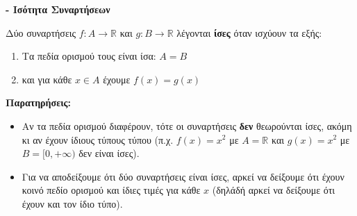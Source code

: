 {\large \textbf{- Ισότητα Συναρτήσεων}}
\vspace{1em}

\begin{tcolorbox}[colback=blue!10!white, colframe=blue!50!black, title=Ορισμός Ισότητας Συνάρτησης (σελ.23)]
Δύο συναρτήσεις $f: A \to \mathbb{R}$ και $g: B \to \mathbb{R}$ λέγονται \textbf{ίσες} όταν ισχύουν τα εξής:
\begin{enumerate}
  \item Τα πεδία ορισμού τους είναι ίσα: $A = B$
  \item και για κάθε $x \in A$ έχουμε $f(x) = g(x)$
\end{enumerate}
\end{tcolorbox}

\vspace{0.5em}

\textbf{Παρατηρήσεις:}
\begin{itemize}
  \item Αν τα πεδία ορισμού διαφέρουν, τότε οι συναρτήσεις \textbf{δεν} θεωρούνται ίσες, ακόμη κι αν έχουν ίδιους τύπους τύπου (π.χ. $f(x)=x^2$ με $A=\mathbb{R}$ και $g(x)=x^2$ με $B=[0,+\infty)$ δεν είναι ίσες).
  \item Για να αποδείξουμε ότι δύο συναρτήσεις είναι ίσες, αρκεί να δείξουμε ότι έχουν κοινό πεδίο ορισμού και ίδιες τιμές για κάθε $x$ (δηλάδή αρκεί να δείξουμε ότι έχουν και τον ίδιο τύπο).
\end{itemize}
